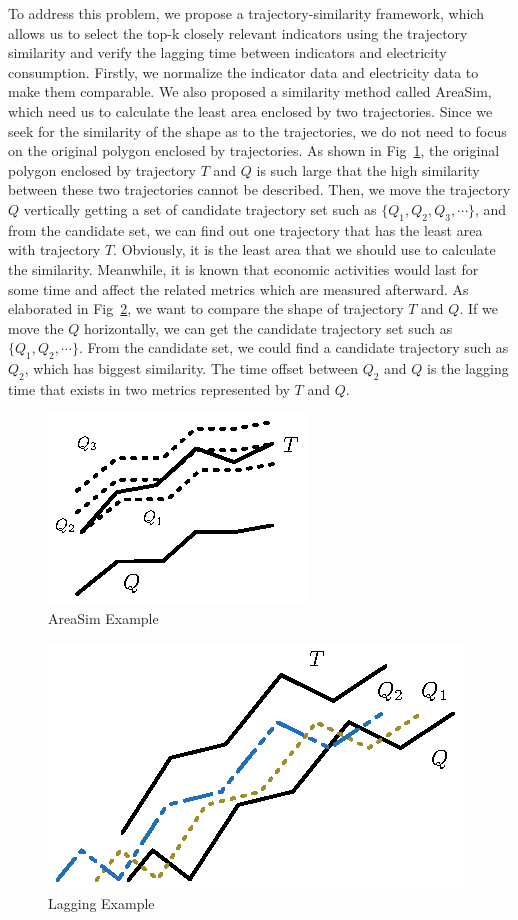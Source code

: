 To address this problem, we propose a trajectory-similarity framework, which allows us to select the top-k closely relevant indicators using the trajectory similarity and verify the lagging time between indicators and electricity consumption. Firstly, we normalize the indicator data and electricity data to make them comparable. We also proposed a similarity method called AreaSim, which need us to calculate the least area enclosed by two trajectories. Since we seek for the similarity of the shape as to the trajectories, we do not need to focus on the original polygon enclosed by trajectories. As shown in Fig~\ref{fig:area-exa}, the original polygon enclosed by trajectory $T$ and $Q$ is such large that the high similarity between these two trajectories cannot be described. Then, we move the trajectory $Q$ vertically getting a set of candidate trajectory set such as $\{Q_1, Q_2, Q_3, \cdots \}$, and from the candidate set, we can find out one trajectory that has the least area with trajectory $T$. Obviously, it is the least area that we should use to calculate the similarity. Meanwhile, it is known that economic activities would last for some time and affect the related metrics which are measured afterward. As elaborated in Fig~\ref{fig:lag-exa}, we want to compare the shape of trajectory $T$ and $Q$. If we move the $Q$ horizontally, we can get the candidate trajectory set such as $\{Q_1, Q_2, \cdots \}$. From the candidate set, we could find a candidate trajectory such as $Q_2$, which has biggest similarity. The time offset between $Q_2$ and $Q$ is the lagging time that exists in two metrics represented by $T$ and $Q$. 
\begin{figure}
	\centering
	\includegraphics{AreaSim-Example}
	\caption{AreaSim Example}
	\label{fig:area-exa}
\end{figure}

\begin{figure}
	\centering
	\includegraphics{Lagging-Example}
	\caption{Lagging Example}
	\label{fig:lag-exa}
\end{figure}

